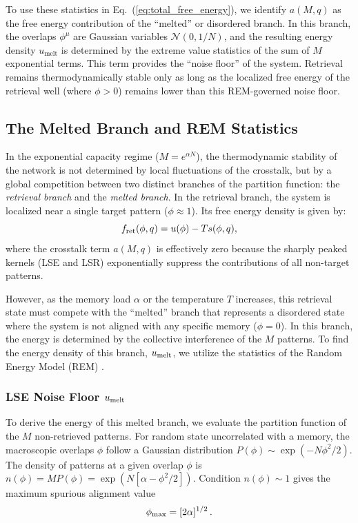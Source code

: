 \documentclass{article}
\theoremstyle{plain}
\theoremstyle{definition}
\theoremstyle{remark}
\begin{document}
To use these statistics in Eq.~(\ref{eq:total_free_energy}), we identify $a(M, q)$ as the free energy contribution of the ``melted'' or disordered branch. In this branch, the overlaps $\phi^\mu$ are Gaussian variables $\mathcal{N}(0, 1/N)$, and the resulting energy density $u_{\text{melt}}$ is determined by the extreme value statistics of the sum of $M$ exponential terms. This term provides the ``noise floor'' of the system. Retrieval remains thermodynamically stable only as long as the localized free energy of the retrieval well (where $\phi > 0$) remains lower than this REM-governed noise floor. 

\subsection{The Melted Branch and REM Statistics}

In the exponential capacity regime ($M = e^{\alpha N}$), the thermodynamic stability of the network is not determined by local fluctuations of the crosstalk, but by a global competition between two distinct branches of the partition function: the \textit{retrieval branch} and the \textit{melted branch}. In the retrieval branch, the system is localized near a single target pattern ($\phi \approx 1$). Its free energy density is given by:
\begin{equation}
    f_{\rm ret}(\phi, q) = u(\phi) - T s(\phi, q),
\end{equation}
where the crosstalk term $a(M, q)$ is effectively zero because the sharply peaked kernels (LSE and LSR) exponentially suppress the contributions of all non-target patterns.

However, as the memory load $\alpha$ or the temperature $T$ increases, this retrieval state must compete with the ``melted'' branch that represents a disordered state where the system is not aligned with any specific memory ($\phi = 0$). In this branch, the energy is determined by the collective interference of the $M$ patterns. To find the energy density of this branch, $u_{\rm melt}$, we utilize the statistics of the Random Energy Model (REM) \cite{derrida1980random}. 

\subsubsection{LSE Noise Floor $u_{\rm melt}$}

To derive the energy of this melted branch, we evaluate the partition function of the $M$ non-retrieved patterns. For random state  uncorrelated with a memory, the macroscopic overlaps $\phi$ follow a Gaussian distribution $P(\phi) \sim \exp(-N\phi^2/2)$. The density of patterns at a given overlap $\phi$ is $n(\phi) = M P(\phi) = \exp(N[\alpha - \phi^2/2])$. Condition $n(\phi) \sim 1$ gives the maximum spurious alignment value 
\begin{equation}
    \phi_{\rm max} = [2\alpha]^{1/2}\,.
    \label{eq:max_spur}
\end{equation}
\end{document}
